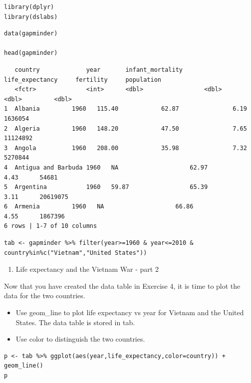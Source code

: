 \documentclass[
]{article}
\providecommand{\tightlist}{%
  \setlength{\itemsep}{0pt}\setlength{\parskip}{0pt}}
\begin{document}
\begin{verbatim}
library(dplyr)
library(dslabs)
\end{verbatim}

\begin{verbatim}
data(gapminder)

head(gapminder)
\end{verbatim}

\begin{verbatim}
   country             year       infant_mortality      life_expectancy     fertility     population
   <fctr>              <int>      <dbl>                 <dbl>               <dbl>         <dbl>
1  Albania         1960   115.40            62.87               6.19      1636054   
2  Algeria         1960   148.20            47.50               7.65      11124892  
3  Angola          1960   208.00            35.98               7.32      5270844   
4  Antigua and Barbuda 1960   NA                    62.97               4.43      54681 
5  Argentina           1960   59.87                 65.39               3.11      20619075  
6  Armenia         1960   NA                    66.86               4.55      1867396   
6 rows | 1-7 of 10 columns
\end{verbatim}

\begin{verbatim}
tab <- gapminder %>% filter(year>=1960 & year<=2010 & country%in%c("Vietnam","United States"))
\end{verbatim}

\begin{enumerate}
\def\labelenumi{\arabic{enumi}.}
\setcounter{enumi}{4}
\tightlist
\item
  Life expectancy and the Vietnam War - part 2
\end{enumerate}

Now that you have created the data table in Exercise 4, it is time to
plot the data for the two countries.

\begin{itemize}
\tightlist
\item
  Use geom\_line to plot life expectancy vs year for Vietnam and the
  United States. The data table is stored in tab.
\item
  Use color to distinguish the two countries.
\end{itemize}

\begin{verbatim}
p <- tab %>% ggplot(aes(year,life_expectancy,color=country)) + geom_line()
p
\end{verbatim}
\end{document}
